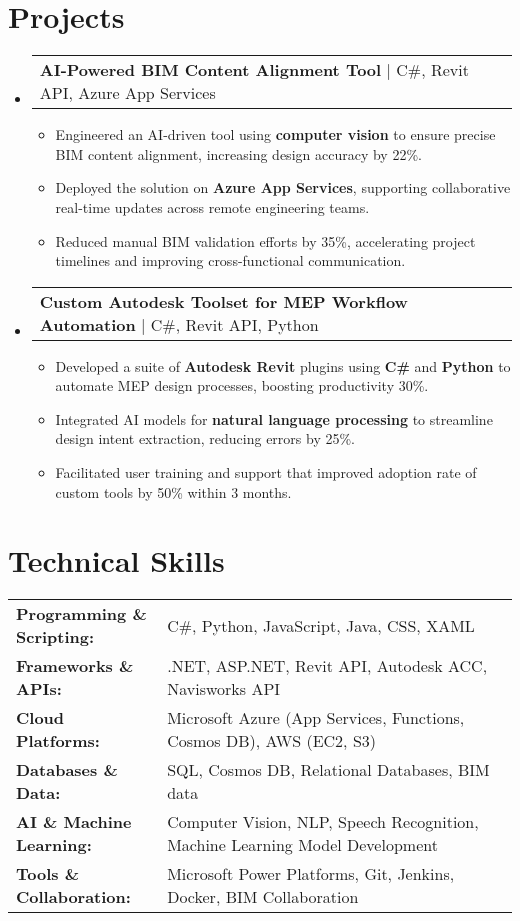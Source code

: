 \documentclass[letterpaper,11pt]{article}
\makeatletter
\newcommand{\resumeItem}[1]{
  \item\footnotesize{
    {#1 \vspace{-2pt}}
  }
}
\newcommand{\resumeProjectHeading}[2]{
    \item
    \begin{tabular*}{1.001\textwidth}{l@{\extracolsep{\fill}}r}
      \small#1 & \textbf{\small #2}\\
    \end{tabular*}\vspace{-7pt}
}
\newcommand{\resumeSubHeadingListStart}{\begin{itemize}[leftmargin=0pt, label={}]}
\newcommand{\resumeSubHeadingListEnd}{\end{itemize}}
\newcommand{\resumeItemListStart}{\begin{itemize}[leftmargin=*]}
\newcommand{\resumeItemListEnd}{\end{itemize}\vspace{-5pt}}
\makeatother
\begin{document}
\section{Projects}
    \vspace{-5pt}
    \resumeSubHeadingListStart
      \resumeProjectHeading
          {\textbf{AI-Powered BIM Content Alignment Tool} | C#, Revit API, Azure App Services}{}
          \resumeItemListStart
              \resumeItem{Engineered an AI-driven tool using \textbf{computer vision} to ensure precise BIM content alignment, increasing design accuracy by 22\%.}
              \resumeItem{Deployed the solution on \textbf{Azure App Services}, supporting collaborative real-time updates across remote engineering teams.}
              \resumeItem{Reduced manual BIM validation efforts by 35\%, accelerating project timelines and improving cross-functional communication.}
          \resumeItemListEnd
          \vspace{-16pt}
      \resumeProjectHeading
          {\textbf{Custom Autodesk Toolset for MEP Workflow Automation} | C#, Revit API, Python}{}
          \resumeItemListStart
              \resumeItem{Developed a suite of \textbf{Autodesk Revit} plugins using \textbf{C#} and \textbf{Python} to automate MEP design processes, boosting productivity 30\%.}
              \resumeItem{Integrated AI models for \textbf{natural language processing} to streamline design intent extraction, reducing errors by 25\%.}
              \resumeItem{Facilitated user training and support that improved adoption rate of custom tools by 50\% within 3 months.}
          \resumeItemListEnd 
    \resumeSubHeadingListEnd
\vspace{-10pt}
\section{Technical Skills}
        \vspace{-14pt}
        \begin{table}[h]
            \footnotesize
            \begin{tabular}{p{0.3\linewidth} p{0.7\linewidth}}
                \textbf{Programming \& Scripting:} & C#, Python, JavaScript, Java, CSS, XAML \\
                \textbf{Frameworks \& APIs:} & .NET, ASP.NET, Revit API, Autodesk ACC, Navisworks API \\
                \textbf{Cloud Platforms:} & Microsoft Azure (App Services, Functions, Cosmos DB), AWS (EC2, S3) \\
                \textbf{Databases \& Data:} & SQL, Cosmos DB, Relational Databases, BIM data \\
                \textbf{AI \& Machine Learning:} & Computer Vision, NLP, Speech Recognition, Machine Learning Model Development \\
                \textbf{Tools \& Collaboration:} & Microsoft Power Platforms, Git, Jenkins, Docker, BIM Collaboration \\
            \end{tabular}
        \end{table}
\end{document}
